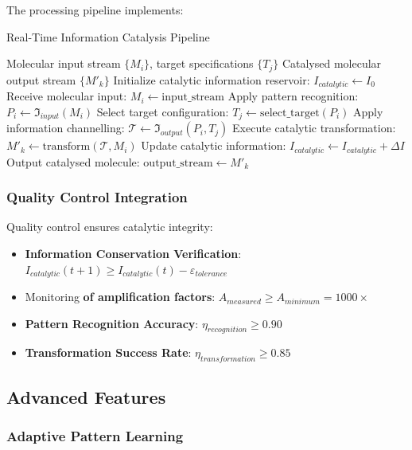 \documentclass[12pt,a4paper]{article}
\begin{document}
The processing pipeline implements:

\begin{algorithm}[H]
\caption{Real-Time Information Catalysis Pipeline}
\begin{algorithmic}[1]
\REQUIRE Molecular input stream $\{M_i\}$, target specifications $\{T_j\}$
\ENSURE Catalysed molecular output stream $\{M'_k\}$
\STATE Initialize catalytic information reservoir: $I_{catalytic} \leftarrow I_0$
    \STATE Receive molecular input: $M_i \leftarrow \text{input\_stream}$
    \STATE Apply pattern recognition: $P_i \leftarrow \mathfrak{I}_{input}(M_i)$
    \STATE Select target configuration: $T_j \leftarrow \text{select\_target}(P_i)$
    \STATE Apply information channelling: $\mathcal{T} \leftarrow \mathfrak{I}_{output}(P_i, T_j)$
    \STATE Execute catalytic transformation: $M'_k \leftarrow \text{transform}(\mathcal{T}, M_i)$
    \STATE Update catalytic information: $I_{catalytic} \leftarrow I_{catalytic} + \Delta I$
    \STATE Output catalysed molecule: $\text{output\_stream} \leftarrow M'_k$
\ENDWHILE
\end{algorithmic}
\end{algorithm}

\subsubsection{Quality Control Integration}

Quality control ensures catalytic integrity:

\begin{itemize}
\item \textbf{Information Conservation Verification}: $I_{catalytic}(t+1) \geq I_{catalytic}(t) - \varepsilon_{tolerance}$
\item Monitoring \textbf{of amplification factors}: $A_{measured} \geq A_{minimum} = 1000\times$
\item \textbf{Pattern Recognition Accuracy}: $\eta_{recognition} \geq 0.90$
\item \textbf{Transformation Success Rate}: $\eta_{transformation} \geq 0.85$
\end{itemize}

\subsection{Advanced Features}

\subsubsection{Adaptive Pattern Learning}
\end{document}
